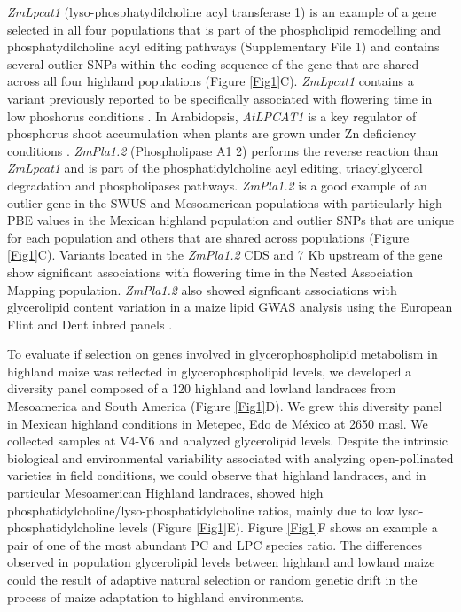 \documentclass[9pt,twocolumn,twoside,lineno]{gsajnl}
\begin{document}
\textit{ZmLpcat1} (lyso-phosphatydilcholine acyl transferase 1) is an example of a gene selected in all four populations that is part of the phospholipid remodelling and phosphatydilcholine acyl editing pathways (Supplementary File 1) and contains several outlier SNPs within the coding sequence of the gene that are shared across all four highland populations (Figure \ref{Fig1}C). \textit{ZmLpcat1} contains a variant previously reported to be specifically associated with flowering time in low phoshorus conditions \cite{xu2018a}. 
In Arabidopsis, \textit{AtLPCAT1} is a key regulator of phosphorus shoot accumulation when plants are grown under Zn deficiency conditions \cite{Kisko2018-zm}.
\textit{ZmPla1.2} (Phospholipase A1 2) performs the reverse reaction than \textit{ZmLpcat1} and is part of the phosphatidylcholine acyl editing, triacylglycerol degradation and phospholipases pathways. 
\textit{ZmPla1.2} is a good example of an outlier gene in the SWUS and Mesoamerican populations with particularly high PBE values in the Mexican highland population and outlier SNPs that are unique for each population and others that are shared across populations (Figure \ref{Fig1}C). 
Variants located in the \textit{ZmPla1.2} CDS \cite{Chen2012-gg} and 7 Kb upstream  of the gene \cite{Hung2012-ms} show significant associations with flowering time in the Nested Association Mapping population. \textit{ZmPla1.2} also showed signficant associations with glycerolipid content variation in a maize lipid GWAS analysis using the European Flint and Dent inbred panels \cite{Riedelsheimer2013-bd}.

To evaluate if selection on genes involved in glycerophospholipid metabolism in highland maize was reflected in glycerophospholipid levels, we developed a diversity panel composed of a 120 highland and lowland landraces from Mesoamerica and South America (Figure \ref{Fig1}D). 
We grew this diversity panel in Mexican highland conditions in Metepec, Edo de México at 2650 masl.
We collected samples at V4-V6 and analyzed glycerolipid levels. 
Despite the intrinsic biological and environmental variability associated with analyzing open-pollinated varieties in field conditions, we could observe that highland landraces, and in particular Mesoamerican Highland landraces, showed  high phosphatidylcholine/lyso-phosphatidylcholine ratios, mainly due to low lyso-phosphatidylcholine levels (Figure \ref{Fig1}E). 
Figure \ref{Fig1}F shows an example a pair of one of the most abundant PC and LPC species ratio. 
The differences observed in population glycerolipid levels between highland and lowland maize could the result of adaptive natural selection or random genetic drift in the process of maize adaptation to highland environments.
\end{document}
